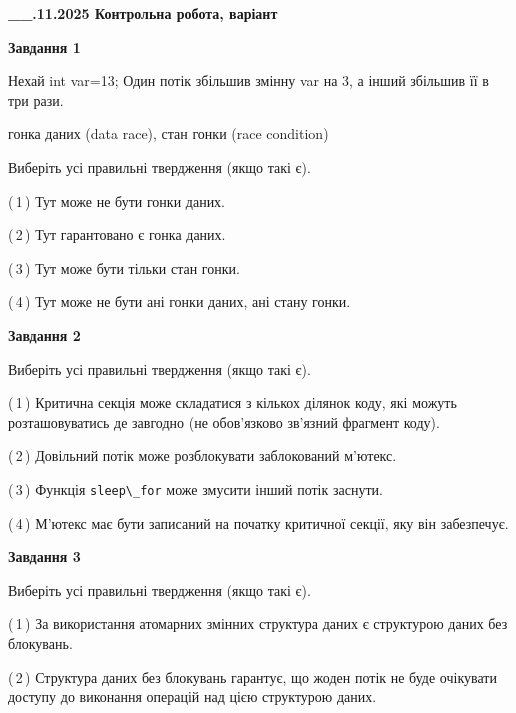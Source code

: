 \documentclass[12pt, ukrainian]{article}
\def\code#1{\Verb!#1!}
\begin{document}
\begin {large}

\textbf{\_\_.11.2025 Контрольна робота, варіант  }\par


{

\begin{center}
\textbf{Завдання 1}
\end{center}
Нехай int var=13; Один потік збільшив змінну var на 3, а інший збільшив її в три рази.

гонка даних (data race), стан гонки (race condition)

Виберіть усі правильні твердження (якщо такі є).\par
\vspace{2mm}
(\,1\,) Тут може не бути гонки даних.%

(\,2\,) Тут гарантовано є гонка даних.%

(\,3\,) Тут може бути тільки стан гонки.%

(\,4\,) Тут може не бути ані гонки даних, ані стану гонки.%



\begin{center}
\textbf{Завдання 2}
\end{center}
Виберіть усі правильні твердження (якщо такі є).\par
\vspace{2mm}

(\,1\,) Критична секція може складатися з кількох ділянок коду, які можуть розташовуватись де завгодно (не обов’язково зв’язний фрагмент коду).%

(\,2\,) Довільний потік може розблокувати заблокований м’ютекс.%

(\,3\,) Функція \code{sleep\_for} може змусити інший потік заснути.%

(\,4\,) М’ютекс має бути записаний на початку критичної секції, яку він забезпечує.%



\begin{center}
\textbf{Завдання 3}
\end{center}
Виберіть усі правильні твердження (якщо такі є).\par
\vspace{2mm}

(\,1\,) За використання атомарних змінних структура даних є структурою даних без блокувань.%

(\,2\,) Структура даних без блокувань гарантує, що жоден потік не буде очікувати доступу до виконання операцій над цією структурою даних.%

}
\end{large}
\end{document}
